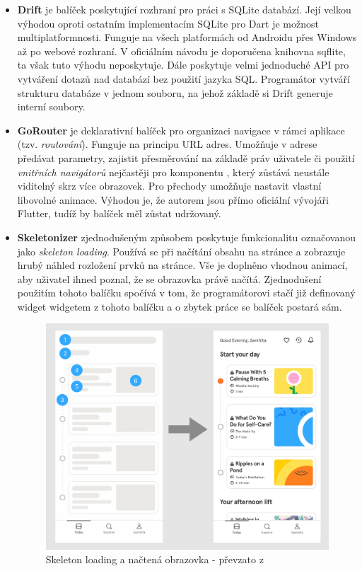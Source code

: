 \documentclass[
  biblatex,
  figures=true,
  tables=false,
  glossaries,
  index
]{kidiplom}
\begin{document}
\begin{itemize}
  \item \textbf{Drift} \cite{drift} je balíček poskytující rozhraní pro práci s SQLite databází. Její velkou výhodou oproti ostatním implementacím SQLite pro Dart je možnost multiplatformnosti. Funguje na všech platformách od Androidu přes Windows až po webové rozhraní. V oficiálním návodu je doporučena knihovna sqflite, ta však tuto výhodu neposkytuje. Dále poskytuje velmi jednoduché API pro vytváření dotazů nad databází bez použití jazyka SQL. Programátor vytváří strukturu databáze v jednom souboru, na jehož základě si Drift generuje interní soubory.
  \item \textbf{GoRouter} \cite{gorouter}je deklarativní balíček pro organizaci navigace v rámci aplikace (tzv. \textit{routování}). Funguje na principu URL adres. Umožňuje v adrese předávat parametry, zajistit přesměrování na základě práv uživatele či použití \textit{vnitřních navigátorů} nejčastěji pro komponentu , který zůstává neustále viditelný skrz více obrazovek. Pro přechody umožňuje nastavit vlastní libovolné animace. Výhodou je, že autorem jsou přímo oficiální vývojáři Flutter, tudíž by balíček měl zůstat udržovaný.
  \item \textbf{Skeletonizer} \cite{skeletonizer} zjednodušeným způsobem poskytuje funkcionalitu označovanou jako \textit{skeleton loading}. Používá se při načítání obsahu na stránce a zobrazuje hrubý náhled rozložení prvků na stránce. Vše je doplněno vhodnou animací, aby uživatel ihned poznal, že se obrazovka právě načítá. Zjednodušení použitím tohoto balíčku spočívá v tom, že programátorovi stačí již definovaný widget  widgetem  z tohoto balíčku a o zbytek práce se balíček postará sám.
  
  \begin{figure}
  	\centering
  	\includegraphics[scale=0.1]{images/skeletonizer.png}
  	\caption{Skeleton loading a načtená obrazovka - převzato z \cite{skeleton}}
  \end{figure}
  

\end{itemize}
\end{document}
